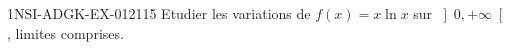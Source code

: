 \begin{exercice}{1NSI-ADGK-EX-012}{1}{15}
Etudier les variations de $f(x) = x\ln x$ sur $\left]0, +\infty\right[$, limites comprises.

\end{exercice}
